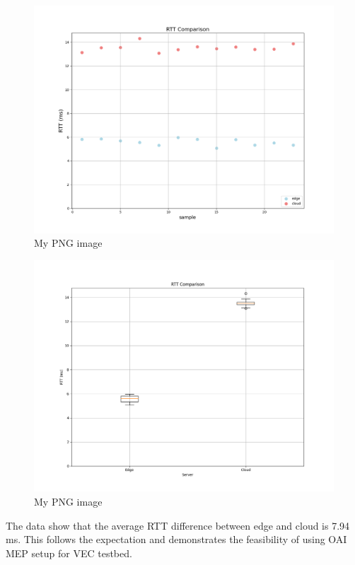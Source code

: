 \documentclass[12pt,a4paper,twoside]{report}
\begin{document}
\begin{figure}[ht]
	\centering
	\includegraphics[width=13cm]{./images/RTT-comparison.png} 
	\caption{My PNG image}
\end{figure}
\begin{figure}[ht]
	\centering
	\includegraphics[width=13cm]{./images/RTT_comp_box.png} 
	\caption{My PNG image}
\end{figure}

The data show that the average RTT difference between edge and cloud is 7.94 ms. This follows the expectation and demonstrates the feasibility of using OAI MEP setup for VEC testbed.
%

\end{document}
